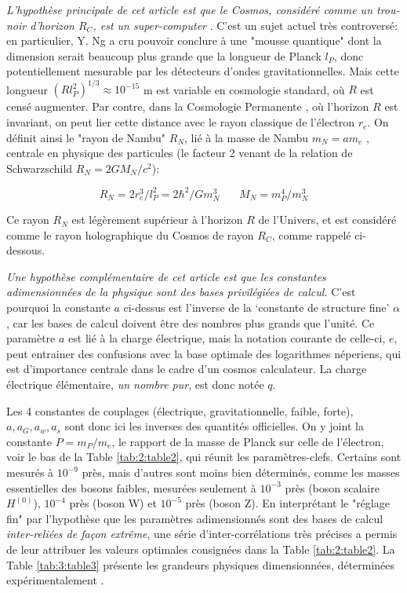 \documentclass[a4paper,9pt]{article}
\begin{document}
\textit{L'hypothèse principale de cet article est que le Cosmos, considéré comme un trou-noir d'horizon $R_C$, est un super-computer} \cite{Sanchez3}. C'est un sujet actuel très controversé: en particulier, Y. Ng \cite{Ng} a cru pouvoir conclure à une "mousse quantique" dont la dimension serait beaucoup plus grande que la longueur de Planck $l_P$, donc potentiellement mesurable par les détecteurs d'ondes gravitationnelles. Mais cette longueur $(Rl_P^2)^{1/3} \approx 10^{-15} $ m est variable en cosmologie standard, où $R$ est censé augmenter. Par contre, dans la Cosmologie Permanente \cite{Sanchez2}, où l'horizon $R$ est invariant, on peut lier cette distance avec le rayon classique de l'électron $r_e$. On définit ainsi le "rayon de Nambu" $R_N$, lié à la masse de Nambu $m_N = am_e$ \cite{Nambu}, centrale en physique des particules (le facteur 2 venant de la relation de Schwarzschild $R_N  = 2GM_N /c^2$): 

\begin{equation}
R_N = 2r_e^3/l_P^2 = 2 \hbar^2/Gm_N^3 ~~~~~~~~ M_N = m_P^4/m_N^3
 \end{equation}
 
 Ce rayon $R_N$ est légèrement supérieur à l'horizon $R$ de l'Univers, et est considéré comme le rayon holographique du Cosmos de rayon $R_C$, comme rappelé ci-dessous. 


\textit{Une hypothèse complémentaire de cet article est que les constantes adimensionnées de la physique sont des bases privilégiées de calcul.} C'est pourquoi la constante $a$ ci-dessus est l'inverse de la ‘constante de structure fine’ \textbf{$\alpha$}, car les bases de calcul doivent être des nombres plus grands que l'unité. Ce paramètre $a$ est lié à la charge électrique, mais la notation courante de celle-ci, $e$, peut entrainer des confusions avec la base optimale des logarithmes néperiens, qui est d’importance centrale dans le cadre d’un cosmos calculateur. La charge électrique élémentaire, \textit{un nombre pur}, est donc notée \textbf{$q$}.


Les 4 constantes de couplages (électrique, gravitationnelle, faible, forte), $a, a_G, a_w, a_s$ sont donc ici les inverses des quantités officielles. On y joint la constante $P = m_P/m_e$, le rapport de la masse de Planck sur celle de l'électron, voir le bas de la Table \ref{tab:2:table2}, qui réunit les paramètres-clefs. Certains sont mesurés à $10^{-9}$ près, mais d'autres sont moins bien déterminés, comme les masses essentielles des bosons faibles, mesurées seulement à $10^{-3}$ près (boson scalaire $H^{(0)}$), $10^{-4}$ près (boson W) et $10^{-5}$ près (boson Z). En interprétant le "réglage fin" par l'hypothèse que les paramètres adimensionnés sont des bases de calcul \textit{inter-reliées de façon extrême}, une série d'inter-corrélations très précises a permis de leur attribuer les valeurs optimales consignées dans la Table \ref{tab:2:table2}. La Table \ref{tab:3:table3} présente les grandeurs physiques dimensionnées, déterminées expérimentalement \cite{Tanabashi}. 
\end{document}
